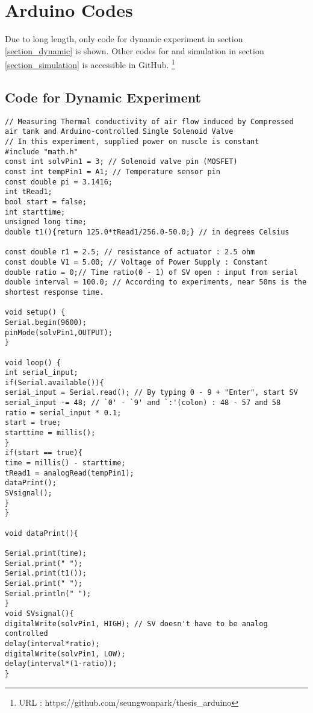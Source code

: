 \section{Arduino Codes}
Due to long length, only code for dynamic experiment in section \ref{section_dynamic} is shown. Other codes for \apc and simulation in section \ref{section_simulation} is accessible in GitHub.
\footnote{URL : https://github.com/seungwonpark/thesis\_arduino}

\subsection{Code for Dynamic Experiment}\label{code_dynamic}
\begin{scriptsize}
\begin{verbatim}
// Measuring Thermal conductivity of air flow induced by Compressed air tank and Arduino-controlled Single Solenoid Valve
// In this experiment, supplied power on muscle is constant
#include "math.h"
const int solvPin1 = 3; // Solenoid valve pin (MOSFET)
const int tempPin1 = A1; // Temperature sensor pin
const double pi = 3.1416;
int tRead1;
bool start = false;
int starttime;
unsigned long time;
double t1(){return 125.0*tRead1/256.0-50.0;} // in degrees Celsius

const double r1 = 2.5; // resistance of actuator : 2.5 ohm
const double V1 = 5.00; // Voltage of Power Supply : Constant
double ratio = 0;// Time ratio(0 - 1) of SV open : input from serial
double interval = 100.0; // According to experiments, near 50ms is the shortest response time.

void setup() {
Serial.begin(9600);
pinMode(solvPin1,OUTPUT);
}

void loop() {
int serial_input;
if(Serial.available()){ 
serial_input = Serial.read(); // By typing 0 - 9 + "Enter", start SV
serial_input -= 48; // `0' - `9' and `:'(colon) : 48 - 57 and 58
ratio = serial_input * 0.1;
start = true;
starttime = millis();
}
if(start == true){
time = millis() - starttime;
tRead1 = analogRead(tempPin1);
dataPrint();
SVsignal();
}
}

void dataPrint(){

Serial.print(time);
Serial.print(" ");
Serial.print(t1());
Serial.print(" ");
Serial.println(" ");
}
void SVsignal(){
digitalWrite(solvPin1, HIGH); // SV doesn't have to be analog controlled
delay(interval*ratio);
digitalWrite(solvPin1, LOW);
delay(interval*(1-ratio));
}
\end{verbatim}
\end{scriptsize}
